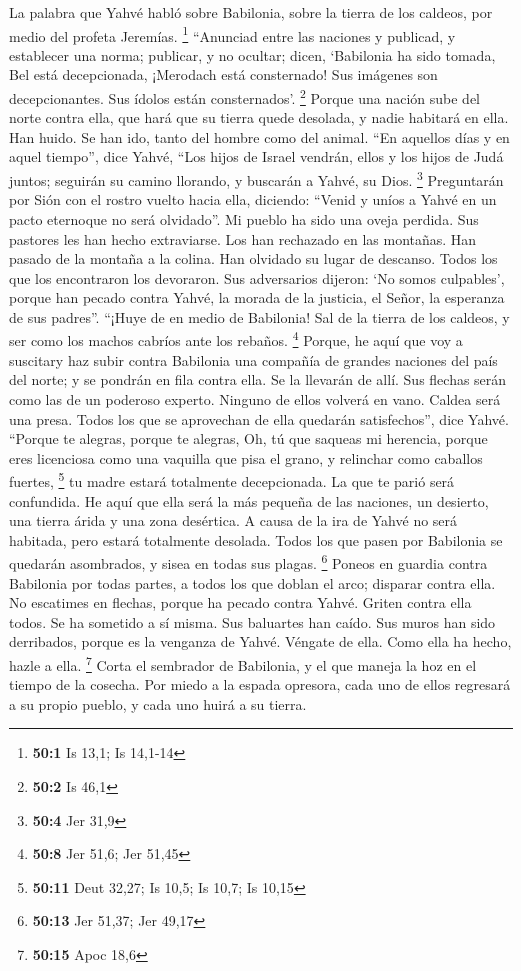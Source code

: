 \begin{paracol}{2}
 La palabra que Yahvé habló sobre Babilonia, sobre la
tierra de los caldeos, por medio del profeta Jeremías. \footnote{\textbf{50:1}
  Is 13,1; Is 14,1-14}  ``Anunciad entre las naciones y
publicad, y establecer una norma; publicar, y no ocultar; dicen,
`Babilonia ha sido tomada, Bel está decepcionada, ¡Merodach está
consternado! Sus imágenes son decepcionantes. Sus ídolos están
consternados'. \footnote{\textbf{50:2} Is 46,1}  Porque
una nación sube del norte contra ella, que hará que su tierra quede
desolada, y nadie habitará en ella. Han huido. Se han ido, tanto del
hombre como del animal.  ``En aquellos días y en aquel
tiempo'', dice Yahvé, ``Los hijos de Israel vendrán, ellos y los hijos
de Judá juntos; seguirán su camino llorando, y buscarán a Yahvé, su
Dios. \footnote{\textbf{50:4} Jer 31,9}  Preguntarán por
Sión con el rostro vuelto hacia ella, diciendo: ``Venid y uníos a Yahvé
en un pacto eternoque no será olvidado''.  Mi pueblo ha
sido una oveja perdida. Sus pastores les han hecho extraviarse. Los han
rechazado en las montañas. Han pasado de la montaña a la colina. Han
olvidado su lugar de descanso.  Todos los que los
encontraron los devoraron. Sus adversarios dijeron: `No somos
culpables', porque han pecado contra Yahvé, la morada de la justicia, el
Señor, la esperanza de sus padres''.  ``¡Huye de en medio
de Babilonia! Sal de la tierra de los caldeos, y ser como los machos
cabríos ante los rebaños. \footnote{\textbf{50:8} Jer 51,6; Jer 51,45}
 Porque, he aquí que voy a suscitary haz subir contra
Babilonia una compañía de grandes naciones del país del norte; y se
pondrán en fila contra ella. Se la llevarán de allí. Sus flechas serán
como las de un poderoso experto. Ninguno de ellos volverá en vano.
 Caldea será una presa. Todos los que se aprovechan de
ella quedarán satisfechos'', dice Yahvé.  ``Porque te
alegras, porque te alegras, Oh, tú que saqueas mi herencia, porque eres
licenciosa como una vaquilla que pisa el grano, y relinchar como
caballos fuertes, \footnote{\textbf{50:11} Deut 32,27; Is 10,5; Is 10,7;
  Is 10,15}  tu madre estará totalmente decepcionada. La
que te parió será confundida. He aquí que ella será la más pequeña de
las naciones, un desierto, una tierra árida y una zona desértica.
 A causa de la ira de Yahvé no será habitada, pero estará
totalmente desolada. Todos los que pasen por Babilonia se quedarán
asombrados, y sisea en todas sus plagas. \footnote{\textbf{50:13} Jer
  51,37; Jer 49,17}  Poneos en guardia contra Babilonia
por todas partes, a todos los que doblan el arco; disparar contra ella.
No escatimes en flechas, porque ha pecado contra Yahvé. 
Griten contra ella todos. Se ha sometido a sí misma. Sus baluartes han
caído. Sus muros han sido derribados, porque es la venganza de Yahvé.
Véngate de ella. Como ella ha hecho, hazle a ella. \footnote{\textbf{50:15}
  Apoc 18,6}  Corta el sembrador de Babilonia, y el que
maneja la hoz en el tiempo de la cosecha. Por miedo a la espada
opresora, cada uno de ellos regresará a su propio pueblo, y cada uno
huirá a su tierra.


\end{paracol}
